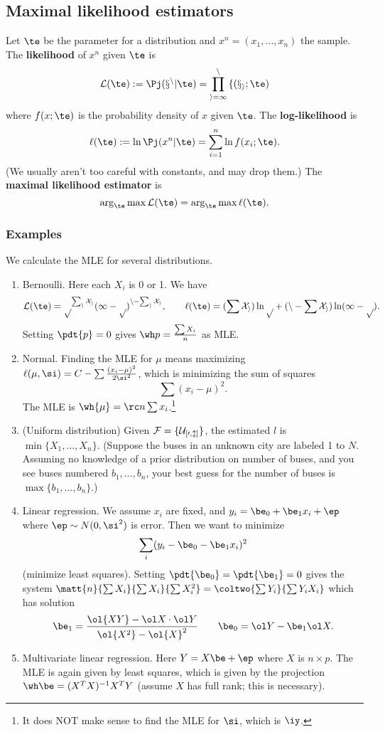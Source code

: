 \subsection{Maximal likelihood estimators}

\begin{df}
Let $\te$ be the parameter for a distribution and $x^n=(x_1,\ldots,x_n)$ the sample. The \textbf{likelihood} of $x^n$ given $\te$ is
\[
\cal L(\te) :=\Pj(x^n|\te) =\prod_{i=1}^n f(x_i;\te)
\]
where $f(x;\te)$ is the probability density of $x$ given $\te$.
The \textbf{log-likelihood} is
\[
\ell(\te):= \ln \Pj(x^n|\te) = \sum_{i=1}^n \ln f(x_i;\te).
\]
(We usually aren't too careful with constants, and may drop them.)
The \textbf{maximal likelihood estimator} is
\[
\arg_{\te}\max \cal L(\te) = \arg_{\te}\max \ell(\te).
\]
\end{df}
\subsubsection{Examples}
We calculate the MLE for several distributions.
\begin{enumerate}
\item
Bernoulli. Here each $X_i$ is 0 or 1. We have
\[
\cal L(\te) = p^{\sum_i X_i} (1-p)^{n-\sum_i X_i}, \qquad \ell(\te) = (\sum X_i) \ln p + (n- \sum X_i)\ln (1-p).
\]
Setting $\pdt{p}=0$ gives $\wh p=\frac{\sum X_i}{n}$ as MLE.
\item
Normal. Finding the MLE for $\mu$ means maximizing $\ell(\mu,\si)=C-\sum \frac{(x_i-\mu)^2}{2\si^2}$, which is minimizing the sum of squares 
\[
\sum (x_i-\mu)^2.
\]
The MLE is $\wh{\mu} = \rc n \sum x_i$.\footnote{It does NOT make sense to find the MLE for $\si$, which is $\iy$.}
\item 
(Uniform distribution)
Given $\cal F=\{U_{[0,l]}\}$, the estimated $l$ is $\min\{X_1,\ldots, X_n\}$. (Suppose the buses in an unknown city are labeled 1 to $N$. Assuming no knowledge of a prior distribution on number of buses, and you see buses numbered $b_1,\ldots, b_n$, your best guess for the number of buses is $\max\{b_1,\ldots, b_n\}$.)
\item
Linear regression. We assume $x_i$ are fixed, and $y_i=\be_0+\be_1x_i+\ep$ where $\ep\sim N(0,\si^2)$ is error. Then we want to minimize
\[
\sum_i (y_i-\be_0-\be_1x_i)^2
\]
(minimize least squares). Setting $\pdt{\be_0}=\pdt{\be_1}=0$ gives the system $\matt{n}{\sum X_i}{\sum X_i}{\sum X_i^2}=\coltwo{\sum Y_i}{\sum Y_iX_i}$ which has solution
\[
\be_1 = \frac{\ol{XY}-\ol X\cdot\ol Y}{\ol{X^2}-\ol{X}^2}\qquad \be_0=\ol Y-\be_1\ol X.
\]
\item Multivariate linear regression. Here $Y=X\be + \ep$ where $X$ is $n\times p$. The MLE is again given by least squares, which is given by the projection $\wh \be = (X^TX)^{-1}X^TY$ (assume $X$ has full rank; this is necessary).
\end{enumerate} 



